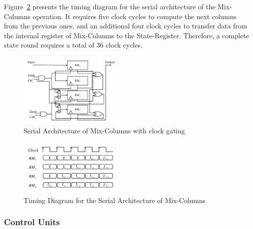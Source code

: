 \documentclass[final,5p,times,twocolumn]{elsarticle}
\begin{document}
Figure~\ref{serial_time_diagrm_mix_colunms} presents the timing diagram for the serial architecture of the Mix-Columns operation.
It requires five clock cycles to compute the next columns from the previous ones, and an additional four clock cycles to transfer data from the internal register of Mix-Columns to the State-Register.
Therefore, a complete state round requires a total of 36 clock cycles.


\begin{figure}[h]%
    \centering
    \includegraphics[width=0.45\textwidth]{./fig/Mix-Columns.pdf}
    \caption{Serial Architecture of Mix-Columns with clock gating}\label{serial_mix_columns_fig}
\end{figure}

\begin{figure}[h]%
    \centering
    \includegraphics[width=0.45\textwidth]{./fig/Mix-Columns-Times.pdf}
    \caption{Timing Diagram for the Serial Architecture of Mix-Columns }
    \label{serial_time_diagrm_mix_colunms}
\end{figure}

\subsubsection{Control Units}\label{subsubsec3}
\end{document}

